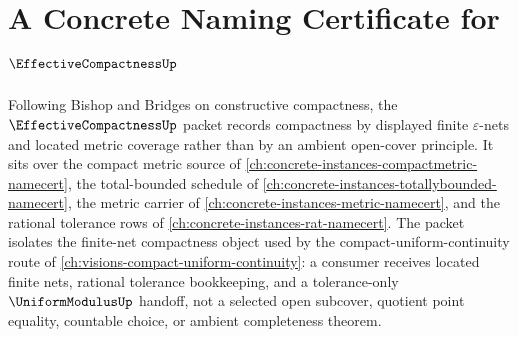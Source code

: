 \chapter{A Concrete Naming Certificate for $\EffectiveCompactnessUp$}
\label{ch:concrete-instances-effectivecompactness-namecert}

Following Bishop and Bridges on constructive compactness, the $\EffectiveCompactnessUp$ packet records compactness by displayed finite $\varepsilon$-nets and located metric coverage rather than by an ambient open-cover principle. It sits over the compact metric source of \autoref{ch:concrete-instances-compactmetric-namecert}, the total-bounded schedule of \autoref{ch:concrete-instances-totallybounded-namecert}, the metric carrier of \autoref{ch:concrete-instances-metric-namecert}, and the rational tolerance rows of \autoref{ch:concrete-instances-rat-namecert}. The packet isolates the finite-net compactness object used by the compact-uniform-continuity route of \autoref{ch:visions-compact-uniform-continuity}: a consumer receives located finite nets, rational tolerance bookkeeping, and a tolerance-only $\UniformModulusUp$ handoff, not a selected open subcover, quotient point equality, countable choice, or ambient completeness theorem.


